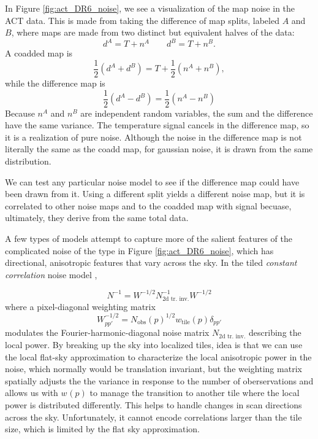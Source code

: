 In  Figure \ref{fig:act_DR6_noise}, we see a visualization of the map noise in the ACT data.  This is made from taking the difference of map splits, labeled $A$ and $B$, where maps are made from two distinct but equivalent halves of the data:
\begin{equation}
  d^A = T + n^A  \qquad d^B = T + n^B.
\end{equation}
A coadded map is 
\begin{equation}
  \frac{1}{2} ( d^A  + d^B ) = T +  \frac{1}{2} (n^A + n^B),
\end{equation}
while the difference map is
\begin{equation}
  \frac{1}{2} ( d^A - d^B ) =  \frac{1}{2} (n^A - n^B)
\end{equation}
Because $n^A$ and $n^B$ are independent random variables, the sum and the difference have the same variance.  The temperature signal cancels in the difference map, so it is a realization of pure noise.  Although the noise in the difference map is not literally the same as the coadd map, for gaussian noise, it is drawn from the same distribution.

We can test any particular noise model to see if the difference map could have been drawn from it.  Using a different split yields a different noise map, but it is correlated to other noise maps and to the coadded map with signal becuase, ultimately, they derive from the same total data.

A few types of models attempt to capture more of the salient features of the complicated noise of the type in Figure \ref{fig:act_DR6_noise}, which has directional, anisotropic features that vary across the sky.  In the tiled \textit{constant correlation} noise model \citep{2020JCAP...12..046N}, 

\begin{equation}
N^{-1} = W^{-1/2} N_\textrm{2d tr.\ inv.}^{-1} W^{-1/2}
\end{equation}
where a pixel-diagonal weighting matrix
\begin{equation}
  W^{-1/2}_{pp'} = N_\textrm{obs}(p) ^{1/2} w_\textrm{tile}(p) \delta_{pp'}
\end{equation}
modulates the Fourier-harmonic-diagonal noise matrix
$ N_\textrm{2d tr.\ inv.}$ describing the local power.
By breaking up the sky into localized tiles, idea is that we can use the local flat-sky approximation to characterize the local anisotropic power in the noise, which normally would be translation invariant, but the weighting matrix spatially adjusts the the variance in response to the number of oberservations and allows us with $w_\textrm{}(p)$ to manage the transition to another tile where the local power is distributed differently.  This helps to handle changes in scan directions across the sky.  Unfortunately, it cannot encode correlations larger than the tile size, which is limited by the flat sky approximation.


